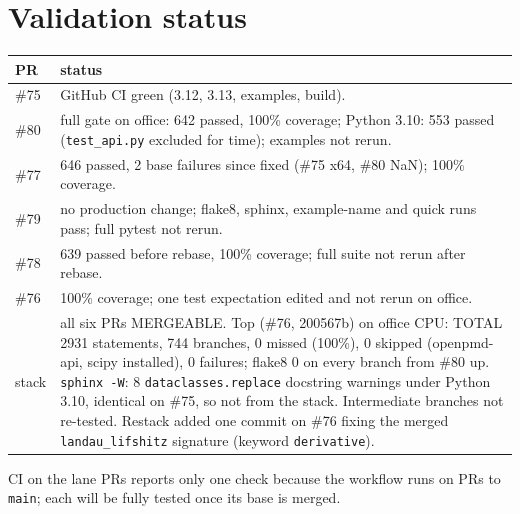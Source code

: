 \documentclass[10pt,a4paper]{article}
\begin{document}
\section{Validation status}\label{sec:status}
\begin{table}[H]\centering\small\begin{tabular}{@{}lp{11.5cm}@{}}\toprule
PR & status\\\midrule
\#75 & GitHub CI green (3.12, 3.13, examples, build).\\
\#80 & full gate on office: 642 passed, 100\% coverage; Python 3.10: 553 passed (\texttt{test\_api.py} excluded for time); examples not rerun.\\
\#77 & 646 passed, 2 base failures since fixed (\#75 x64, \#80 NaN); 100\% coverage.\\
\#79 & no production change; flake8, sphinx, example-name and quick runs pass; full pytest not rerun.\\
\#78 & 639 passed before rebase, 100\% coverage; full suite not rerun after rebase.\\
\#76 & 100\% coverage; one test expectation edited and not rerun on office.\\
stack & all six PRs MERGEABLE. Top (\#76, 200567b) on office CPU: TOTAL 2931 statements, 744 branches, 0 missed (100\%), 0 skipped (openpmd-api, scipy installed), 0 failures; flake8 0 on every branch from \#80 up. \texttt{sphinx -W}: 8 \texttt{dataclasses.replace} docstring warnings under Python 3.10, identical on \#75, so not from the stack. Intermediate branches not re-tested. Restack added one commit on \#76 fixing the merged \texttt{landau\_lifshitz} signature (keyword \texttt{derivative}).\\\bottomrule
\end{tabular}\end{table}
CI on the lane PRs reports only one check because the workflow runs on PRs to \texttt{main}; each will be
fully tested once its base is merged.
\end{document}

